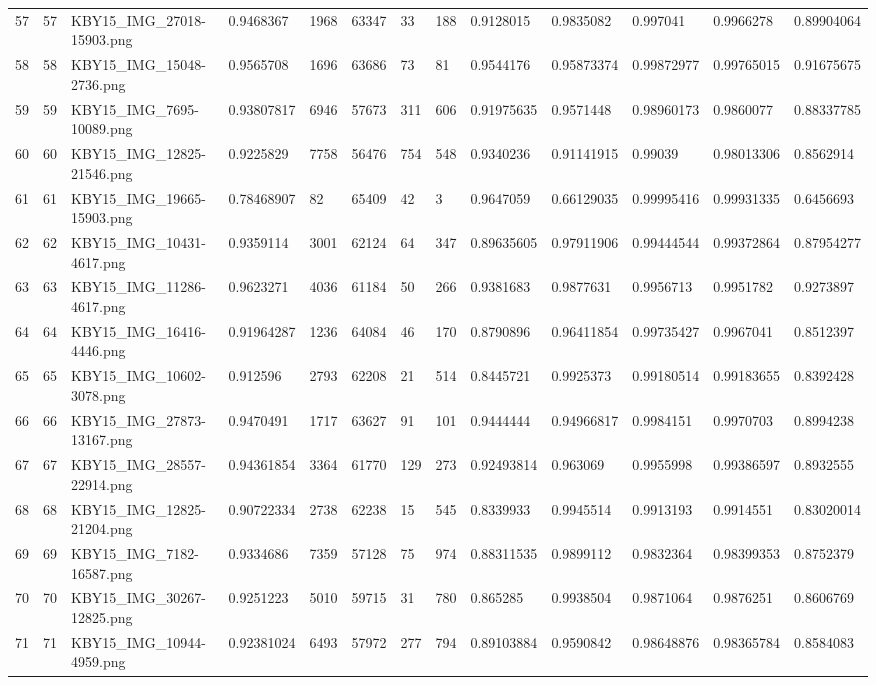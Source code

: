 \documentclass[11pt, a4paper, twoside]{report}
\begin{document}
\begin{longtable}[c]{@{}lllllllllllll@{}}
57 & 57 & KBY15\_IMG\_27018-15903.png & 0.9468367 & 1968 & 63347 & 33 & 188 & 0.9128015 & 0.9835082 & 0.997041 & 0.9966278 & 0.89904064 \\
58 & 58 & KBY15\_IMG\_15048-2736.png & 0.9565708 & 1696 & 63686 & 73 & 81 & 0.9544176 & 0.95873374 & 0.99872977 & 0.99765015 & 0.91675675 \\
59 & 59 & KBY15\_IMG\_7695-10089.png & 0.93807817 & 6946 & 57673 & 311 & 606 & 0.91975635 & 0.9571448 & 0.98960173 & 0.9860077 & 0.88337785 \\
60 & 60 & KBY15\_IMG\_12825-21546.png & 0.9225829 & 7758 & 56476 & 754 & 548 & 0.9340236 & 0.91141915 & 0.99039 & 0.98013306 & 0.8562914 \\
61 & 61 & KBY15\_IMG\_19665-15903.png & 0.78468907 & 82 & 65409 & 42 & 3 & 0.9647059 & 0.66129035 & 0.99995416 & 0.99931335 & 0.6456693 \\
62 & 62 & KBY15\_IMG\_10431-4617.png & 0.9359114 & 3001 & 62124 & 64 & 347 & 0.89635605 & 0.97911906 & 0.99444544 & 0.99372864 & 0.87954277 \\
63 & 63 & KBY15\_IMG\_11286-4617.png & 0.9623271 & 4036 & 61184 & 50 & 266 & 0.9381683 & 0.9877631 & 0.9956713 & 0.9951782 & 0.9273897 \\
64 & 64 & KBY15\_IMG\_16416-4446.png & 0.91964287 & 1236 & 64084 & 46 & 170 & 0.8790896 & 0.96411854 & 0.99735427 & 0.9967041 & 0.8512397 \\
65 & 65 & KBY15\_IMG\_10602-3078.png & 0.912596 & 2793 & 62208 & 21 & 514 & 0.8445721 & 0.9925373 & 0.99180514 & 0.99183655 & 0.8392428 \\
66 & 66 & KBY15\_IMG\_27873-13167.png & 0.9470491 & 1717 & 63627 & 91 & 101 & 0.9444444 & 0.94966817 & 0.9984151 & 0.9970703 & 0.8994238 \\
67 & 67 & KBY15\_IMG\_28557-22914.png & 0.94361854 & 3364 & 61770 & 129 & 273 & 0.92493814 & 0.963069 & 0.9955998 & 0.99386597 & 0.8932555 \\
68 & 68 & KBY15\_IMG\_12825-21204.png & 0.90722334 & 2738 & 62238 & 15 & 545 & 0.8339933 & 0.9945514 & 0.9913193 & 0.9914551 & 0.83020014 \\
69 & 69 & KBY15\_IMG\_7182-16587.png & 0.9334686 & 7359 & 57128 & 75 & 974 & 0.88311535 & 0.9899112 & 0.9832364 & 0.98399353 & 0.8752379 \\
70 & 70 & KBY15\_IMG\_30267-12825.png & 0.9251223 & 5010 & 59715 & 31 & 780 & 0.865285 & 0.9938504 & 0.9871064 & 0.9876251 & 0.8606769 \\
71 & 71 & KBY15\_IMG\_10944-4959.png & 0.92381024 & 6493 & 57972 & 277 & 794 & 0.89103884 & 0.9590842 & 0.98648876 & 0.98365784 & 0.8584083 \\

\end{longtable}
\end{document}
